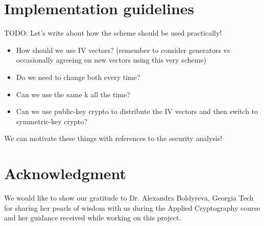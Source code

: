 \documentclass[conference]{IEEEtran}
\begin{document}
\section{Implementation guidelines}

{\color{red}
TODO: Let’s write about how the scheme should be used practically!
\begin{itemize}
  \item How should we use IV vectors? (remember to consider generators vs occasionally agreeing on new vectors using this very scheme)
  \item Do we need to change both every time?
  \item Can we use the same k all the time?
  \item Can we use public-key crypto to distribute the IV vectors and then switch to symmetric-key crypto?
\end{itemize}
We can motivate these things with references to the security analysis!
}



\section*{Acknowledgment}

We would like to show our gratitude to Dr. Alexandra Boldyreva, Georgia Tech for sharing her pearls of wisdom with us during the Applied Cryptography course and her guidance received while working on this project.








%
%
%

\end{document}
